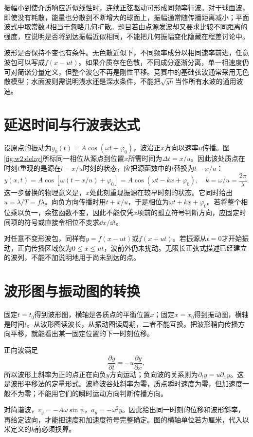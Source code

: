 振幅小到使介质响应近似线性时，连续正弦驱动可形成同频率行波。对于球面波，即使没有耗散，能量也分散到不断增大的球面上，振幅通常随传播距离减小；平面波式中取常数$A$相当于忽略几何扩散。题目若由点源发波却又要求比较不同距离的强度，应说明是否将到达振幅近似相同，不能把几何振幅变化隐藏在程差讨论中。

波形是否保持不变也有条件。无色散近似下，不同频率成分以相同速率前进，任意波包可以写成$f(x-ut)$。如果介质存在色散，不同成分逐渐分离，单一相速度仍可对简谐分量定义，但整个波包不再是刚性平移。竞赛中的基础弦波通常采用无色散模型；水面波则需说明浅水还是深水条件，不能把$\sqrt{gh}$当作所有水波的通用波速。


\section{延迟时间与行波表达式}
设原点的振动为$y_0(t)=A\cos(\omega t+\varphi_0)$，波沿正$x$方向以速率$u$传播。图\ref{fig:w2:delay}所标同一相位从源点到位置$x$所需时间为$\Delta t=x/u$。因此该处质点在时刻$t$重现的是源在$t-x/u$时刻的状态，应把源函数中的$t$替换为$t-x/u$：
\[
y(x,t)=A\cos[\omega(t-x/u)+\varphi_0]
=A\cos(\omega t-kx+\varphi_0),
\quad k=\omega/u=\frac{2\pi}{\lambda}.
\]
这一步替换的物理意义是，$x$处此刻重现振源在较早时刻的状态。它同时给出$u=\lambda/T=f\lambda$。向负方向传播时用$t+x/u$，于是相位为$\omega t+kx+\varphi_0$。若将整个相位乘以负一，余弦函数不变，因此不能仅凭$x$项前的孤立符号判断方向，应固定时间项的符号或直接令相位不变求$\dd x/\dd t$。

对任意不变形波包，同样有$y=f(x-ut)$或$f(x+ut)$。若振源从$t=0$才开始振动，正向传播区域仅为$0\le x\le ut$，波前外仍未扰动。无限长正弦式描述已经建立的波列，不能不加说明地用于尚未到达的点。

\section{波形图与振动图的转换}
固定$t=t_0$得到波形图，横轴是各质点的平衡位置$x$；固定$x=x_0$得到振动图，横轴是时间$t$。从波形图读波长，从振动图读周期，二者不能互换。把波形稍向传播方向平移，就能看出某一固定位置的下一时刻位移。

正向波满足
\[
\frac{\partial y}{\partial t}=-u\frac{\partial y}{\partial x},
\]
所以波形上斜率为正的点正在向负$y$方向运动；负向波的关系则为$\partial_ty=u\partial_xy$。这是波形平移法的定量形式。波峰波谷处斜率为零，质点瞬时速度为零，但加速度一般不为零；不能用它们的瞬时运动方向判断传播方向。

对简谐波，$v_y=-A\omega\sin\psi$，$a_y=-\omega^2y$。因此给出同一时刻的位移和波形斜率，再给定波向，才能把速度和加速度符号完整确定。图的横轴单位若为厘米，代入以米定义的$k$前必须换算。

